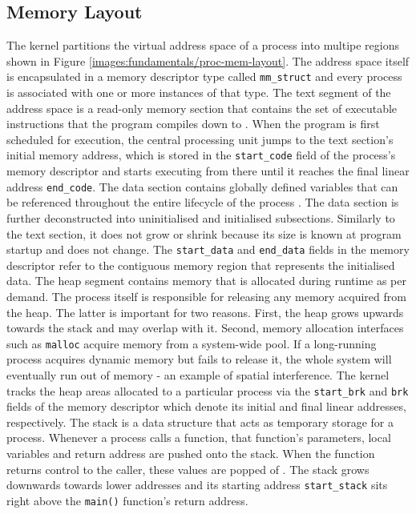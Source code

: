\subsection{Memory Layout}
\label{ch:fundamentals/processes/memory-layout}
The kernel partitions the virtual address space of a process into multipe regions shown in Figure 
\ref{images:fundamentals/proc-mem-layout}. The address space itself is encapsulated in a 
memory descriptor type called \verb|mm_struct| \cite{include/linux/mm_types.h} and 
every process is associated with one or more instances of that type. The text 
segment of the address space is a read-only memory section that contains the set of executable 
instructions that the program compiles down to \cite{10.5555/2490781}. When the program is 
first scheduled for execution, the central processing unit jumps to the text section's 
initial memory address, which is stored in the \verb|start_code| field of the process's memory descriptor
and starts executing from there until it reaches the final linear address \verb|end_code|.
The data section contains globally defined variables that can be referenced throughout the 
entire lifecycle of the process \cite{10.5555/2490781}. The data section is further deconstructed 
into uninitialised and initialised subsections. Similarly to the text section, it
does not grow or shrink because its size is known at program startup and does not change. 
The \verb|start_data| and \verb|end_data| fields in the memory descriptor refer to the 
contiguous memory region that represents the initialised data. 
The heap segment contains memory that is allocated during runtime as per demand. The process 
itself is responsible for releasing any memory acquired from the heap. The latter is important for two 
reasons. First, the heap grows upwards towards the stack and may overlap with it. Second, 
memory allocation interfaces such as \verb|malloc| acquire memory from a system-wide pool. If a 
long-running process acquires dynamic memory but fails to release it, the whole system will 
eventually run out of memory - an example of spatial interference. The kernel tracks the heap areas 
allocated to a particular process via the \verb|start_brk| and \verb|brk| fields of the memory 
descriptor which denote its initial and final linear addresses, respectively. 
The stack is a data structure that acts as temporary storage for a process. Whenever 
a process calls a function, that function's parameters, local variables and return address are pushed 
onto the stack. When the function returns control to the caller, these values are popped of \cite{10.5555/2490781}.
The stack grows downwards towards lower addresses and its starting address \verb|start_stack|
sits right above the \verb|main()| function's return address. 

